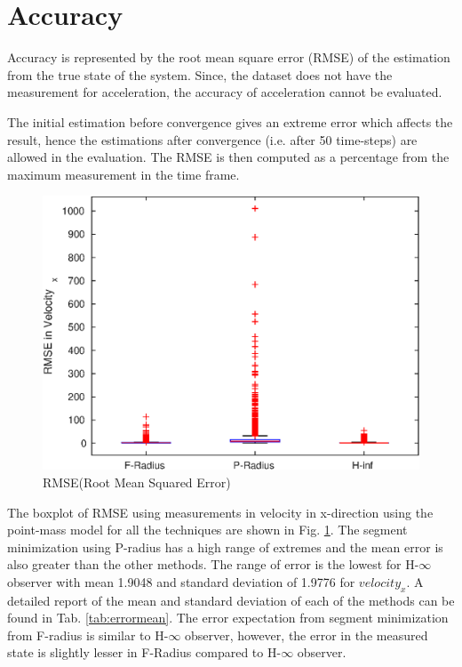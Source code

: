 \section{Accuracy}
Accuracy is represented by the root mean square error (RMSE) of the estimation from the true state of the system. Since, the dataset does not have the measurement for acceleration, the accuracy of acceleration cannot be evaluated.

The initial estimation before convergence gives an extreme error which affects the result, hence the estimations after convergence (i.e. after 50 time-steps) are allowed in the evaluation. The RMSE is then computed as a percentage from the maximum measurement in the time frame.

\begin{figure}[h]
\centering
\includegraphics[width=\linewidth]{figures/Error/boxplotall}
\caption{RMSE(Root Mean Squared Error)}
\label{fig:boxplot}
\end{figure}

The boxplot of RMSE using measurements in velocity in x-direction using the point-mass model for all the techniques are shown in Fig. \ref{fig:boxplot}. The segment minimization using P-radius has a high range of extremes and the mean error is also greater than the other methods. The range of error is the lowest for H-$\infty$ observer with mean 
1.9048 and standard deviation of 1.9776 for $velocity_x$. A detailed report of the mean and standard deviation of each of the methods can be found in Tab. \ref{tab:errormean}. The error expectation from segment minimization from F-radius is similar to H-$\infty$ observer, however, the error in the measured state is slightly lesser in F-Radius compared to H-$\infty$ observer.


